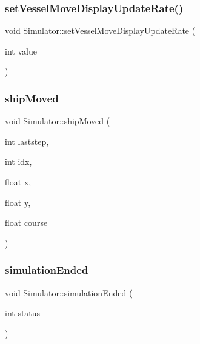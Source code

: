 \subsubsection{\texorpdfstring{setVesselMoveDisplayUpdateRate()}{setVesselMoveDisplayUpdateRate()}}
{\footnotesize\ttfamily void Simulator\+::set\+Vessel\+Move\+Display\+Update\+Rate (\begin{DoxyParamCaption}\item[{int}]{value }\end{DoxyParamCaption})}

\mbox{\label{class_simulator_a26d53673251424dda5f581b9b6095a69}} 
\subsubsection{\texorpdfstring{shipMoved}{shipMoved}}
{\footnotesize\ttfamily void Simulator\+::ship\+Moved (\begin{DoxyParamCaption}\item[{int}]{laststep,  }\item[{int}]{idx,  }\item[{float}]{x,  }\item[{float}]{y,  }\item[{float}]{course }\end{DoxyParamCaption})\hspace{0.3cm}{\ttfamily [signal]}}

\mbox{\label{class_simulator_a7d91f3582160384e49a5986e002bc81a}} 
\subsubsection{\texorpdfstring{simulationEnded}{simulationEnded}}
{\footnotesize\ttfamily void Simulator\+::simulation\+Ended (\begin{DoxyParamCaption}\item[{int}]{status }\end{DoxyParamCaption})\hspace{0.3cm}{\ttfamily [signal]}}

\mbox{\label{class_simulator_a607d820eb7bca0092853a3c861e57e70}} 
